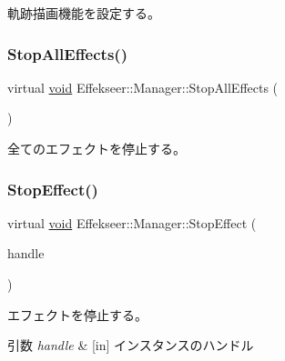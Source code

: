 軌跡描画機能を設定する。 

\mbox{\label{class_effekseer_1_1_manager_a65a6043aace92f52bcb8f7fc1052d3f0}} 
\subsubsection{\texorpdfstring{Stop\+All\+Effects()}{StopAllEffects()}}
{\footnotesize\ttfamily virtual \mbox{\hyperlink{namespace_effekseer_ab34c4088e512200cf4c2716f168deb56}{void}} Effekseer\+::\+Manager\+::\+Stop\+All\+Effects (\begin{DoxyParamCaption}{ }\end{DoxyParamCaption})\hspace{0.3cm}{\ttfamily [pure virtual]}}



全てのエフェクトを停止する。 

\mbox{\label{class_effekseer_1_1_manager_a7a4a9ff929146f8ea21aa4705b352baa}} 
\subsubsection{\texorpdfstring{Stop\+Effect()}{StopEffect()}}
{\footnotesize\ttfamily virtual \mbox{\hyperlink{namespace_effekseer_ab34c4088e512200cf4c2716f168deb56}{void}} Effekseer\+::\+Manager\+::\+Stop\+Effect (\begin{DoxyParamCaption}\item[{\mbox{\hyperlink{namespace_effekseer_afba58b8d812da862190e9bbfc040824a}{Handle}}}]{handle }\end{DoxyParamCaption})\hspace{0.3cm}{\ttfamily [pure virtual]}}



エフェクトを停止する。 


\begin{DoxyParams}{引数}
{\em handle} & \mbox{[}in\mbox{]} インスタンスのハンドル \\
\hline
\end{DoxyParams}
\mbox{\label{class_effekseer_1_1_manager_adbde475d5977ca36c0a3a4c1e6878b33}} 
